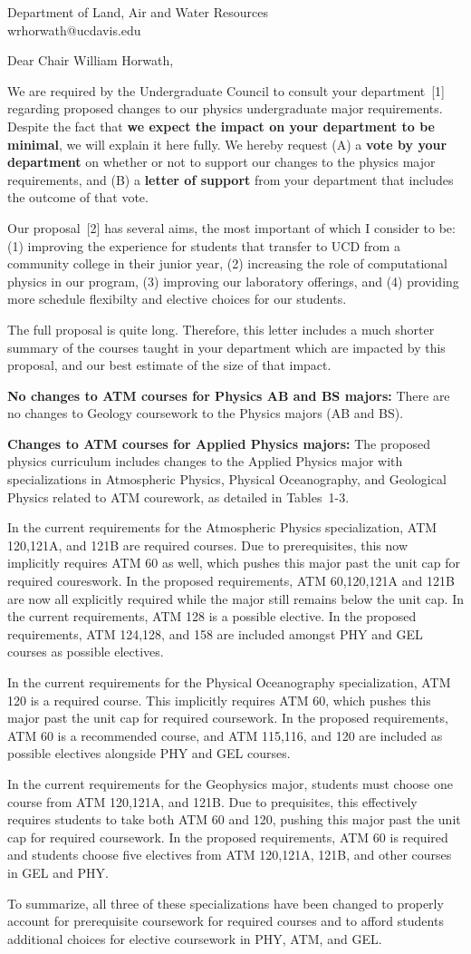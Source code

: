 \documentclass[letterpaper,12pt]{letter}
\def\letterparta{
We are required by the Undergraduate Council to consult your
department~[1] regarding proposed changes to our physics undergraduate
major requirements.  Despite the fact that {\bf we expect the
  impact on your department to be minimal}, we will explain it here
fully.  We hereby request (A) a {\bf vote by your department} on
whether or not to support our changes to the physics major
requirements, and (B) a {\bf letter of support} from your department
that includes the outcome of that vote.

Our proposal~[2] has several aims, the most important of which I
consider to be: (1) improving the experience for students that
transfer to UCD from a community college in their junior year, (2)
increasing the role of computational physics in our program, (3)
improving our laboratory offerings, and (4) providing more schedule
flexibilty and elective choices for our students.

The full proposal is quite long.  Therefore, this letter includes a
much shorter summary of the courses taught in your department which
are impacted by this proposal, and our best estimate of the size of
that impact.
}
\begin{document}
\begin{letter}{Department of Land, Air and Water Resources \\ wrhorwath@ucdavis.edu}
  
\opening{Dear Chair William Horwath,}

\letterparta

{\bf No changes to ATM courses for Physics AB and BS majors:} There
are no changes to Geology coursework to the Physics majors (AB and
BS).

{\bf Changes to ATM courses for Applied Physics majors:} The proposed
physics curriculum includes changes to the Applied Physics major with
specializations in Atmospheric Physics, Physical Oceanography, and
Geological Physics related to ATM courework, as detailed in
Tables~1-3.

In the current requirements for the Atmospheric Physics
specialization, ATM 120,121A, and 121B are required courses.  Due to
prerequisites, this now implicitly requires ATM 60 as well, which
pushes this major past the unit cap for required coureswork.  In the
proposed requirements, ATM 60,120,121A and 121B are now all explicitly
required while the major still remains below the unit cap.  In the
current requirements, ATM 128 is a possible elective.  In the proposed
requirements, ATM 124,128, and 158 are included amongst PHY and GEL
courses as possible electives.

In the current requirements for the Physical Oceanography
specialization, ATM 120 is a required course.  This implicitly
requires ATM 60, which pushes this major past the unit cap for
required coursework.  In the proposed requirements, ATM 60 is a
recommended course, and ATM 115,116, and 120 are included as possible
electives alongside PHY and GEL courses.

In the current requirements for the Geophysics major, students must
choose one course from ATM 120,121A, and 121B.  Due to prequisites,
this effectively requires students to take both ATM 60 and 120, 
pushing this major past the unit cap for required coursework.  In the
proposed requirements, ATM 60 is required and students choose five
electives from ATM 120,121A, 121B, and other courses in GEL and PHY.

To summarize, all three of these specializations have been changed to
properly account for prerequisite coursework for required courses and
to afford students additional choices for elective coursework in PHY,
ATM, and GEL.


\end{letter}
\end{document}
